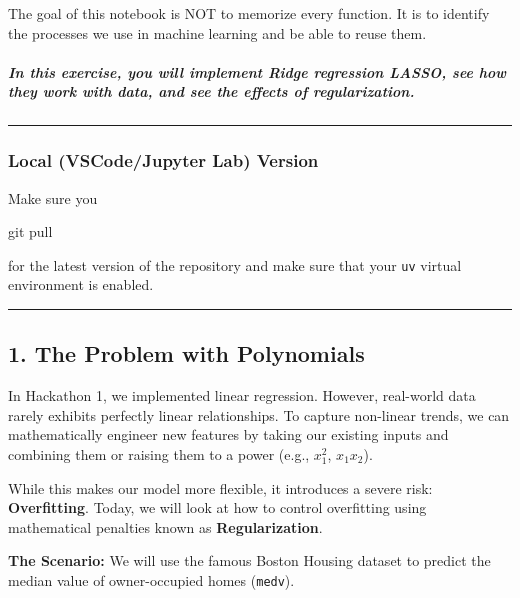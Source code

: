\documentclass[11pt]{article}
\newenvironment{Shaded}{}{}
\newcommand{\FunctionTok}[1]{\textcolor[rgb]{0.02,0.16,0.49}{{#1}}}
\newcommand{\NormalTok}[1]{{#1}}
\begin{document}
{The goal of this notebook is NOT to memorize every function. It is to
identify the processes we use in machine learning and be able to reuse
them.}

\subparagraph{In this exercise, you will implement Ridge regression
LASSO, see how they work with data, and see the effects of
regularization.}\label{in-this-exercise-you-will-implement-ridge-regression-lasso-see-how-they-work-with-data-and-see-the-effects-of-regularization.}

\begin{center}\rule{0.5\linewidth}{0.5pt}\end{center}

    \subsubsection{Local (VSCode/Jupyter Lab)
Version}\label{local-vscodejupyter-lab-version}

Make sure you

\begin{Shaded}
\begin{Highlighting}[]
\FunctionTok{git}\NormalTok{ pull}
\end{Highlighting}
\end{Shaded}

for the latest version of the repository and make sure that your
\texttt{uv} virtual environment is enabled.

\begin{center}\rule{0.5\linewidth}{0.5pt}\end{center}

    \subsection{1. The Problem with
Polynomials}\label{the-problem-with-polynomials}

In Hackathon 1, we implemented linear regression. However, real-world
data rarely exhibits perfectly linear relationships. To capture
non-linear trends, we can mathematically engineer new features by taking
our existing inputs and combining them or raising them to a power (e.g.,
\(x_1^2\), \(x_1x_2\)).

While this makes our model more flexible, it introduces a severe risk:
\textbf{Overfitting}. Today, we will look at how to control overfitting
using mathematical penalties known as \textbf{Regularization}.

\textbf{The Scenario:} We will use the famous Boston Housing dataset to
predict the median value of owner-occupied homes (\texttt{medv}).
\end{document}
